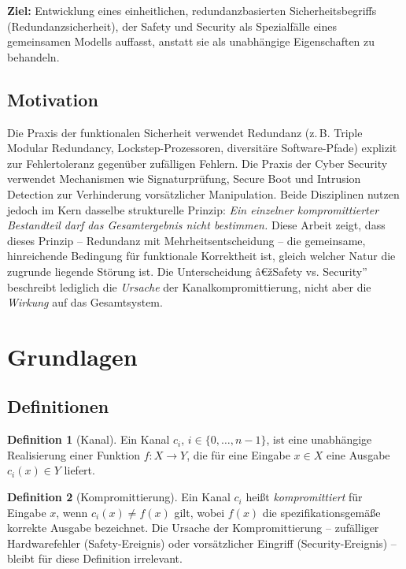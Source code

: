 ﻿\documentclass[a4paper,12pt]{article}
\theoremstyle{definition}
\newtheorem{definition}{Definition}
\begin{document}
\textbf{Ziel:} Entwicklung eines einheitlichen, redundanzbasierten Sicherheitsbegriffs (Redundanzsicherheit), der Safety und Security als Spezialfälle eines gemeinsamen Modells auffasst, anstatt sie als unabhängige Eigenschaften zu behandeln.

\subsection{Motivation}

Die Praxis der funktionalen Sicherheit verwendet Redundanz (z.\,B. Triple Modular Redundancy, Lockstep-Prozessoren, diversitäre Software-Pfade) explizit zur Fehlertoleranz gegenüber zufälligen Fehlern. Die Praxis der Cyber Security verwendet Mechanismen wie Signaturprüfung, Secure Boot und Intrusion Detection zur Verhinderung vorsätzlicher Manipulation. Beide Disziplinen nutzen jedoch im Kern dasselbe strukturelle Prinzip: \emph{Ein einzelner kompromittierter Bestandteil darf das Gesamtergebnis nicht bestimmen.} Diese Arbeit zeigt, dass dieses Prinzip -- Redundanz mit Mehrheitsentscheidung -- die gemeinsame, hinreichende Bedingung für funktionale Korrektheit ist, gleich welcher Natur die zugrunde liegende Störung ist. Die Unterscheidung â€žSafety vs. Security'' beschreibt lediglich die \emph{Ursache} der Kanalkompromittierung, nicht aber die \emph{Wirkung} auf das Gesamtsystem.

\section{Grundlagen}

\subsection{Definitionen}

\begin{definition}[Kanal]
	Ein Kanal $c_i$, $i \in \{0,\ldots,n-1\}$, ist eine unabhängige Realisierung einer Funktion $f: X \to Y$, die für eine Eingabe $x \in X$ eine Ausgabe $c_i(x) \in Y$ liefert.
\end{definition}

\begin{definition}[Kompromittierung]
	Ein Kanal $c_i$ heißt \emph{kompromittiert} für Eingabe $x$, wenn $c_i(x) \neq f(x)$ gilt, wobei $f(x)$ die spezifikationsgemäße korrekte Ausgabe bezeichnet. Die Ursache der Kompromittierung -- zufälliger Hardwarefehler (Safety-Ereignis) oder vorsätzlicher Eingriff (Security-Ereignis) -- bleibt für diese Definition irrelevant.
\end{definition}
\end{document}
